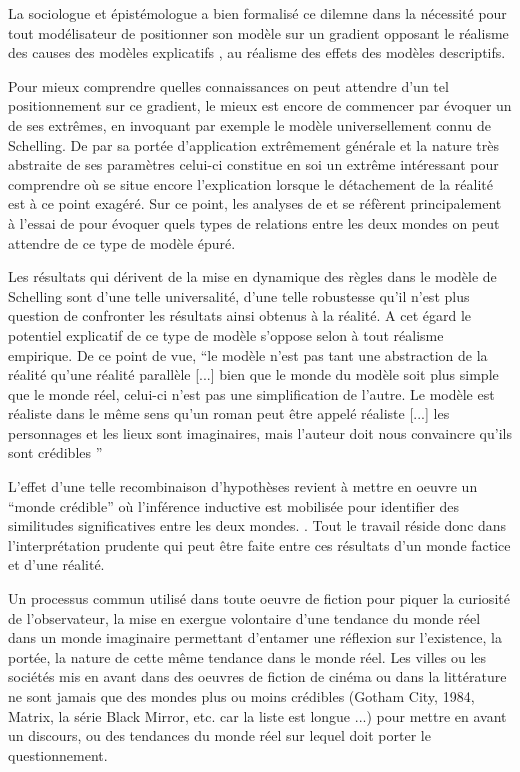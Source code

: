 La sociologue et épistémologue \textcite{Bulle2005} a bien formalisé ce dilemne dans la nécessité pour tout modélisateur de positionner son modèle sur un gradient opposant le réalisme des causes des modèles explicatifs , au réalisme des effets des modèles descriptifs.

Pour mieux comprendre quelles connaissances on peut attendre d'un tel positionnement sur ce gradient, le mieux est encore de commencer par évoquer un de ses extrêmes, en invoquant par exemple le modèle universellement connu de Schelling. De par sa portée d'application extrêmement générale et la nature très abstraite de ses paramètres celui-ci constitue en soi un extrême intéressant pour comprendre où se situe encore l'explication lorsque le détachement de la réalité est à ce point exagéré. Sur ce point, les analyses de \textcite{Bulle2005} et \textcites{Phan2008, Phan2010} se réfèrent principalement à l'essai de \textcite{Sugden2002} pour évoquer quels types de relations entre les deux mondes on peut attendre de ce type de modèle épuré.

Les résultats qui dérivent de la mise en dynamique des règles dans le modèle de Schelling sont d'une telle universalité, d'une telle robustesse qu'il n'est plus question de confronter les résultats ainsi obtenus à la réalité. A cet égard le potentiel explicatif de ce type de modèle s'oppose selon \textcite{Bulle2005} à tout réalisme empirique. De ce point de vue, \enquote{le modèle n'est pas tant une abstraction de la réalité qu’une réalité parallèle [...] bien que le monde du modèle soit plus simple que le monde réel, celui-ci n'est pas une simplification de l'autre. Le modèle est réaliste dans le même sens qu'un roman peut être appelé réaliste [...] les personnages et les lieux sont imaginaires, mais l'auteur doit nous convaincre qu'ils sont crédibles } \autocites[131]{Sugden2002}[10]{Phan2008}

L'effet d'une telle recombinaison d'hypothèses revient à mettre en oeuvre un \enquote{monde crédible} où l'inférence inductive est mobilisée pour identifier des similitudes significatives entre les deux mondes. \autocites{Livet2006, Phan2008}. Tout le travail réside donc dans l'interprétation prudente qui peut être faite entre ces résultats d'un monde factice et d'une réalité.

Un processus commun utilisé dans toute oeuvre de fiction pour piquer la curiosité de l'observateur, la mise en exergue volontaire d'une tendance du monde réel dans un monde imaginaire permettant d'entamer une réflexion sur l'existence, la portée, la nature de cette même tendance dans le monde réel. Les villes ou les sociétés mis en avant dans des oeuvres de fiction de cinéma ou dans la littérature ne sont jamais que des mondes plus ou moins crédibles (Gotham City, 1984, Matrix, la série Black Mirror, etc. car la liste est longue ...)  pour mettre en avant un discours, ou des tendances du monde réel sur lequel doit porter le questionnement. %


